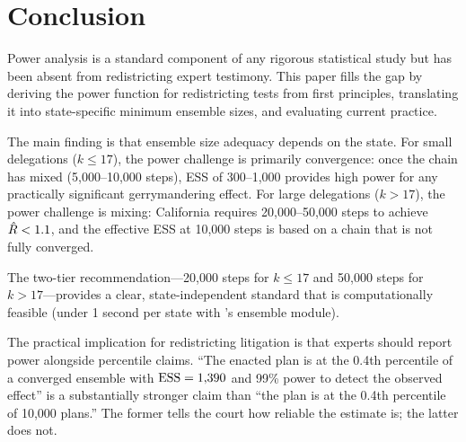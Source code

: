 \section{Conclusion}
\label{sec:conclusion}

Power analysis is a standard component of any rigorous statistical study
but has been absent from redistricting expert testimony.
This paper fills the gap by deriving the power function for redistricting
tests from first principles, translating it into state-specific minimum
ensemble sizes, and evaluating current practice.

The main finding is that ensemble size adequacy depends on the state.
For small delegations ($k \leq 17$), the power challenge is primarily
convergence: once the chain has mixed (5,000--10,000 steps), ESS of
300--1,000 provides high power for any practically significant
gerrymandering effect.
For large delegations ($k > 17$), the power challenge is mixing:
California requires 20,000--50,000 steps to achieve $\hat{R} < 1.1$,
and the effective ESS at 10,000 steps is based on a chain that is not
fully converged.

The two-tier recommendation---20,000 steps for $k \leq 17$ and 50,000
steps for $k > 17$---provides a clear, state-independent standard that
is computationally feasible (under 1 second per state with \bisect{}'s
ensemble module).

The practical implication for redistricting litigation is that experts
should report power alongside percentile claims.
``The enacted plan is at the 0.4th percentile of a converged ensemble
with $\mathrm{ESS} = 1{,}390$ and 99\% power to detect the observed effect''
is a substantially stronger claim than ``the plan is at the 0.4th percentile
of 10,000 plans.''
The former tells the court how reliable the estimate is; the latter does not.
